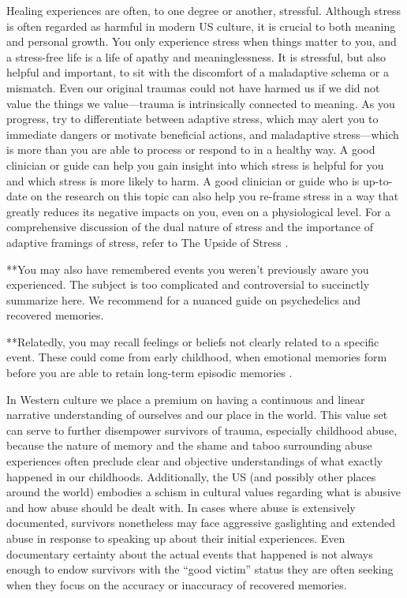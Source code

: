 \documentclass[12pt,letterpaper]{book}
\begin{document}
Healing experiences are often, to one degree or another, stressful. Although stress is often regarded as harmful in modern US culture, it is crucial to both meaning and personal growth. You only experience stress when things matter to you, and a stress-free life is a life of apathy and meaninglessness. It is stressful, but also helpful and important, to sit with the discomfort of a maladaptive schema or a mismatch. Even our original traumas could not have harmed us if we did not value the things we value—trauma is intrinsically connected to meaning. As you progress, try to differentiate between adaptive stress, which may alert you to immediate dangers or motivate beneficial actions, and maladaptive stress—which is more than you are able to process or respond to in a healthy way. A good clinician or guide can help you gain insight into which stress is helpful for you and which stress is more likely to harm. A good clinician or guide who is up-to-date on the research on this topic can also help you re-frame stress in a way that greatly reduces its negative impacts on you, even on a physiological level. For a comprehensive discussion of the dual nature of stress and the importance of adaptive framings of stress, refer to The Upside of Stress \cite{mcgonigalStress}.

**You may also have remembered events you weren't previously aware you experienced. The subject is too complicated and controversial to succinctly summarize here. We recommend \textcite{psychedelicrecoveredmemory} for a nuanced guide on psychedelics and recovered memories.

**Relatedly, you may recall feelings or beliefs not clearly related to a specific event. These could come from early childhood, when emotional memories form before you are able to retain long-term episodic memories \cite{brownAttachmentDisturbances}.

In Western  culture we place a premium on having a continuous and linear narrative understanding of ourselves and our place in the world. This value set can serve to further disempower survivors of trauma, especially childhood abuse, because the nature of memory and the shame and taboo surrounding abuse experiences often preclude clear and objective understandings of what exactly happened in our childhoods. Additionally, the US (and possibly other places around the world) embodies a schism in cultural values regarding what is abusive and how abuse should be dealt with. In cases where abuse is extensively documented, survivors nonetheless may face aggressive gaslighting and extended abuse in response to speaking up about their initial experiences. Even documentary certainty about the actual events that happened is not always enough to endow survivors with the “good victim” status they are often seeking when they focus on the accuracy or inaccuracy of recovered memories.
\end{document}
